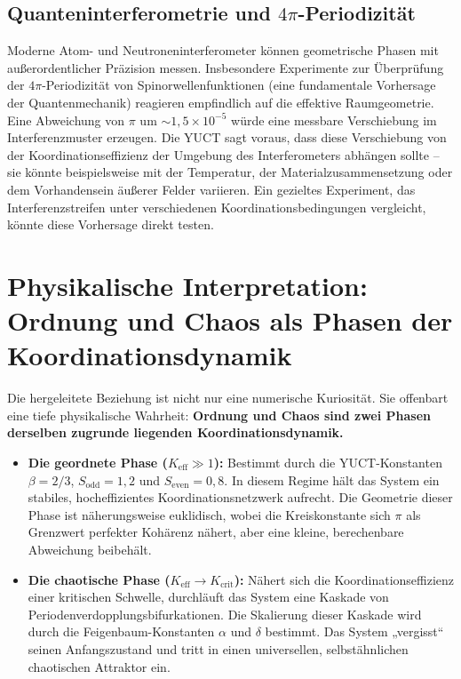 \documentclass[12pt,a4paper]{article}
\begin{document}
	\subsection{Quanteninterferometrie und \(4\pi\)-Periodizität}
	
	Moderne Atom- und Neutroneninterferometer können geometrische Phasen mit außerordentlicher Präzision messen. Insbesondere Experimente zur Überprüfung der \(4\pi\)-Periodizität von Spinorwellenfunktionen (eine fundamentale Vorhersage der Quantenmechanik) reagieren empfindlich auf die effektive Raumgeometrie. Eine Abweichung von \(\pi\) um \(\sim 1{,}5\times10^{-5}\) würde eine messbare Verschiebung im Interferenzmuster erzeugen. Die YUCT sagt voraus, dass diese Verschiebung von der Koordinationseffizienz der Umgebung des Interferometers abhängen sollte – sie könnte beispielsweise mit der Temperatur, der Materialzusammensetzung oder dem Vorhandensein äußerer Felder variieren. Ein gezieltes Experiment, das Interferenzstreifen unter verschiedenen Koordinationsbedingungen vergleicht, könnte diese Vorhersage direkt testen.
	
	\section{Physikalische Interpretation: Ordnung und Chaos als Phasen der Koordinationsdynamik}
	
	Die hergeleitete Beziehung ist nicht nur eine numerische Kuriosität. Sie offenbart eine tiefe physikalische Wahrheit: \textbf{Ordnung und Chaos sind zwei Phasen derselben zugrunde liegenden Koordinationsdynamik.}
	
	\begin{itemize}
		\item \textbf{Die geordnete Phase (\(K_{\mathrm{eff}} \gg 1\)):} Bestimmt durch die YUCT-Konstanten \(\beta = 2/3\), \(S_{\mathrm{odd}} = 1{,}2\) und \(S_{\mathrm{even}} = 0{,}8\). In diesem Regime hält das System ein stabiles, hocheffizientes Koordinationsnetzwerk aufrecht. Die Geometrie dieser Phase ist näherungsweise euklidisch, wobei die Kreiskonstante sich \(\pi\) als Grenzwert perfekter Kohärenz nähert, aber eine kleine, berechenbare Abweichung beibehält.
		
		\item \textbf{Die chaotische Phase (\(K_{\mathrm{eff}} \to K_{\mathrm{crit}}\)):} Nähert sich die Koordinationseffizienz einer kritischen Schwelle, durchläuft das System eine Kaskade von Periodenverdopplungsbifurkationen. Die Skalierung dieser Kaskade wird durch die Feigenbaum-Konstanten \(\alpha\) und \(\delta\) bestimmt. Das System „vergisst“ seinen Anfangszustand und tritt in einen universellen, selbstähnlichen chaotischen Attraktor ein.
	\end{itemize}
	
\end{document}
